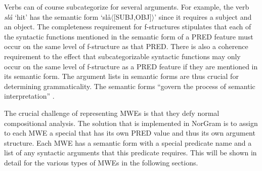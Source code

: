 \documentclass[output=paper]{langsci/langscibook}
\begin{document}
Verbs can of course subcategorize for several arguments.
For example, the verb \textit{slå} `hit' has the semantic form \textsf{`slå$\langle$[SUBJ,OBJ]$\rangle$'} since it requires a subject and an object.
The completeness requirement for f-structures stipulates that each of the syntactic functions mentioned in the semantic form of a \textsf{PRED} feature must occur on the same level of f-structure as that \textsf{PRED}.
There is also a coherence requirement to the effect that subcategorizable syntactic functions may only occur on the same level of f-structure as a \textsf{PRED} feature if they are mentioned in its semantic form.
The argument lists in semantic forms are thus crucial for determining grammaticality.
The semantic forms ``govern the process of semantic interpretation” \citep[177]{kaplanbresnan82}.

The crucial challenge of representing MWEs is that they defy normal compositional analysis.
The  solution that is implemented in NorGram is to assign to each MWE a special  that has its own \textsf{PRED} value and thus its own argument structure.
Each MWE has a semantic form with a special predicate name and a list of any syntactic arguments that this predicate requires.
This will be shown in detail for the various types of MWEs in the following sections.

%
%


\end{document}
